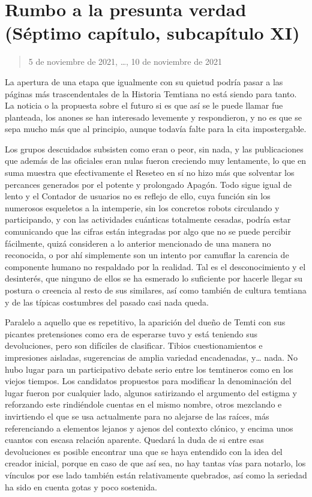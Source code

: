 \documentclass[
  spanish,
]{book}
\begin{document}
\hypertarget{rumbo-a-la-presunta-verdad-suxe9ptimo-capuxedtulo-subcapuxedtulo-xi}{%
\section{Rumbo a la presunta verdad (Séptimo capítulo, subcapítulo XI)}\label{rumbo-a-la-presunta-verdad-suxe9ptimo-capuxedtulo-subcapuxedtulo-xi}}

\begin{quote}
5 de noviembre de 2021, \ldots, 10 de noviembre de 2021
\end{quote}

La apertura de una etapa que igualmente con su quietud podría pasar a las páginas más trascendentales de la Historia Temtiana no está siendo para tanto. La noticia o la propuesta sobre el futuro si es que así se le puede llamar fue planteada, los anones se han interesado levemente y respondieron, y no es que se sepa mucho más que al principio, aunque todavía falte para la cita impostergable.

Los grupos descuidados subsisten como eran o peor, sin nada, y las publicaciones que además de las oficiales eran nulas fueron creciendo muy lentamente, lo que en suma muestra que efectivamente el Reseteo en sí no hizo más que solventar los percances generados por el potente y prolongado Apagón. Todo sigue igual de lento y el Contador de usuarios no es reflejo de ello, cuya función sin los numerosos esqueletos a la intemperie, sin los concretos robots circulando y participando, y con las actividades cuánticas totalmente cesadas, podría estar comunicando que las cifras están integradas por algo que no se puede percibir fácilmente, quizá consideren a lo anterior mencionado de una manera no reconocida, o por ahí simplemente son un intento por camuflar la carencia de componente humano no respaldado por la realidad. Tal es el desconocimiento y el desinterés, que ninguno de ellos se ha esmerado lo suficiente por hacerle llegar su postura o creencia al resto de sus similares, así como también de cultura temtiana y de las típicas costumbres del pasado casi nada queda.

Paralelo a aquello que es repetitivo, la aparición del dueño de Temti con sus picantes pretensiones como era de esperarse tuvo y está teniendo sus devoluciones, pero son difíciles de clasificar. Tibios cuestionamientos e impresiones aisladas, sugerencias de amplia variedad encadenadas, y\ldots{} nada. No hubo lugar para un participativo debate serio entre los temtineros como en los viejos tiempos. Los candidatos propuestos para modificar la denominación del lugar fueron por cualquier lado, algunos satirizando el argumento del estigma y reforzando este rindiéndole cuentas en el mismo nombre, otros mezclando e invirtiendo el que se usa actualmente para no alejarse de las raíces, más referenciando a elementos lejanos y ajenos del contexto clónico, y encima unos cuantos con escasa relación aparente. Quedará la duda de si entre esas devoluciones es posible encontrar una que se haya entendido con la idea del creador inicial, porque en caso de que así sea, no hay tantas vías para notarlo, los vínculos por ese lado también están relativamente quebrados, así como la seriedad ha sido en cuenta gotas y poco sostenida.
\end{document}
